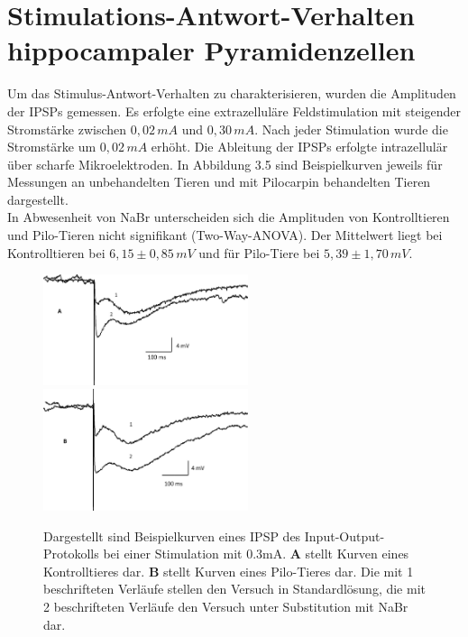 \documentclass[a4paper,11pt]{report}
\begin{document}
{%



\section{Stimulations-Antwort-Verhalten hippocampaler Pyramidenzellen}
Um das Stimulus-Antwort-Verhalten zu charakterisieren, wurden die Amplituden der IPSPs gemessen. Es erfolgte eine extrazelluläre Feldstimulation mit steigender Stromstärke zwischen $0,02$\,$mA$ und $0,30$\,$mA$. Nach jeder Stimulation wurde die Stromstärke um $0,02$\,$mA$ erhöht. Die Ableitung der IPSPs erfolgte intrazellulär über scharfe Mikroelektroden. In Abbildung 3.5 sind Beispielkurven jeweils für Messungen an unbehandelten Tieren und mit Pilocarpin behandelten Tieren dargestellt.\\


In Abwesenheit von NaBr unterscheiden sich die Amplituden von Kontrolltieren und Pilo-Tieren nicht signifikant (Two-Way-ANOVA). Der Mittelwert liegt bei Kontrolltieren bei $6,15 \pm 0,85\,mV$ und für Pilo-Tiere bei $5,39 \pm 1,70\,mV$.\\

\begin{figure}[H]
\begin{center}
\includegraphics[width=6cm]{Abbildungen/inout_kontrolle_sample.jpg}
\includegraphics[width=6cm]{Abbildungen/inout_pilo_sample.jpg}
\caption{Dargestellt sind Beispielkurven eines IPSP des Input-Output-Protokolls bei einer Stimulation mit 0.3mA. \textbf{A}  stellt Kurven eines Kontrolltieres dar. \textbf{B} stellt Kurven eines Pilo-Tieres dar. Die mit 1 beschrifteten Verläufe stellen den Versuch in Standardlösung, die mit 2 beschrifteten Verläufe den Versuch unter Substitution mit NaBr dar.}
\end{center}
\end{figure}




}
\end{document}
